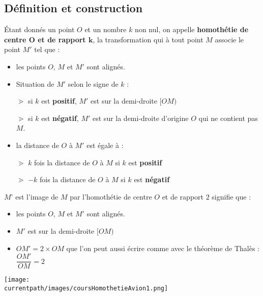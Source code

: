 \subsection{Définition et construction}
\begin{definition}
    Étant donnés un point $O$ et un nombre $k$ non nul, on appelle \textbf{homothétie de centre $\mathbf{O}$ et de rapport $\mathbf{k}$}, la transformation qui à tout point $M$ associe le point $M'$ tel que :
    \begin{itemize}
        \item les points $O$, $M$ et $M'$ sont alignés.
        \item Situation de $M'$ selon le signe de $k$ :
        
        \hspace*{1cm}$\gtrdot$ si $k$ est \textbf{positif}, $M'$ est sur la demi-droite $[OM)$

        \hspace*{1cm}$\gtrdot$ si $k$ est \textbf{négatif}, $M'$ est sur la demi-droite d'origine $O$ qui ne contient pas $M$.
        \item la distance de $O$ à $M'$ est égale à :
        
        \hspace*{1cm}$\gtrdot$ $k$ fois la distance de $O$ à $M$ si $k$ est \textbf{positif}

        \hspace*{1cm}$\gtrdot$ $-k$ fois la distance de $O$ à $M$ si $k$ est \textbf{négatif}
    \end{itemize}
\end{definition}

\begin{exemple*1}

    $M’$ est l’image de $M$ par l’homothétie de centre $O$ et de rapport $2$ signifie que :
    \begin{itemize}
        \item les points $O$, $M$ et $M'$ sont alignés.
        \item $M'$ est sur la demi-droite $[OM)$
        \item $OM'=2\times OM$ que l'on peut aussi écrire comme avec le théorème de Thalès : $\dfrac{OM'}{OM}=2$
    \end{itemize}
    \begin{center}
        \texttt{[image: \\currentpath/images/coursHomothetieAvion1.png]} 
    \end{center}
\end{exemple*1}

